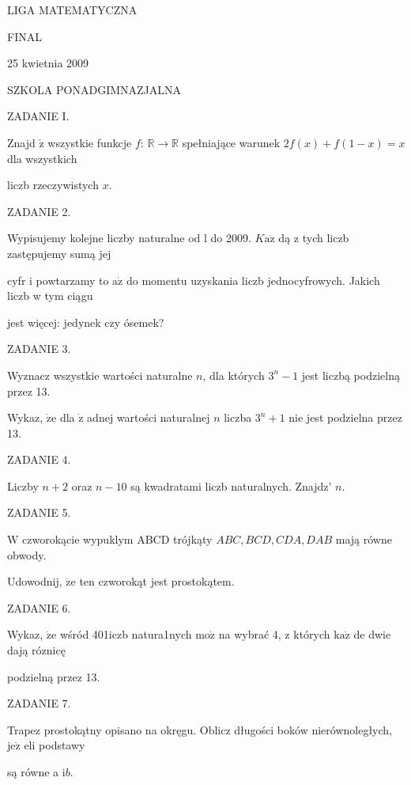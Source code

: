 \documentclass[a4paper,12pt]{article}
\begin{document}
LIGA MATEMATYCZNA

FINAL

25 kwietnia 2009

SZKOLA PONADGIMNAZJALNA

ZADANIE I.

Znajd $\acute{\mathrm{z}}$ wszystkie funkcje $f$: $\mathbb{R}\rightarrow \mathbb{R}$ spełniające warunek $2f(x)+f(1-x)=x$ dla wszystkich

liczb rzeczywistych $x.$

ZADANIE 2.

Wypisujemy kolejne liczby naturalne od l do 2009. $K\mathrm{a}\dot{\mathrm{z}}$ dą z tych liczb zastępujemy sumą jej

cyfr i powtarzamy to $\mathrm{a}\dot{\mathrm{z}}$ do momentu uzyskania liczb jednocyfrowych. Jakich liczb w tym ciągu

jest więcej: jedynek czy ósemek?

ZADANIE 3.

Wyznacz wszystkie wartości naturalne $n$, dla których $3^{n}-1$ jest liczbą podzielną przez 13.

Wykaz, $\dot{\mathrm{z}}\mathrm{e}$ dla $\dot{\mathrm{z}}$ adnej wartości naturalnej $n$ liczba $3^{n}+1$ nie jest podzielna przez 13.

ZADANIE 4.

Liczby $n+2$ oraz $n-10$ są kwadratami liczb naturalnych. Znajdz' $n.$

ZADANIE 5.

$\mathrm{W}$ czworokącie wypuklym ABCD trójkąty $ABC, BCD, CDA, DAB$ mają równe obwody.

Udowodnij, $\dot{\mathrm{z}}\mathrm{e}$ ten czworokąt jest prostokątem.

ZADANIE 6.

Wykaz, $\dot{\mathrm{z}}\mathrm{e}$ wśród 401iczb natura1nych $\mathrm{m}\mathrm{o}\dot{\mathrm{z}}$ na wybrać 4, z których $\mathrm{k}\mathrm{a}\dot{\mathrm{z}}$ de dwie dają róznicę

podzielną przez 13.

ZADANIE 7.

Trapez prostokątny opisano na okręgu. Oblicz długości boków nierównoległych, $\mathrm{j}\mathrm{e}\dot{\mathrm{z}}$ eli podstawy

są równe a $\mathrm{i}b.$
\end{document}

